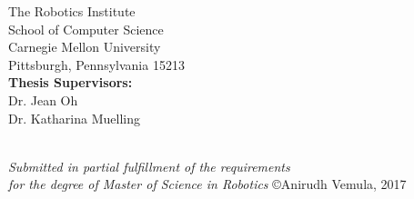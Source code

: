 \begin{center}
\vspace{1cm}
{\Large
  The Robotics Institute\\
  School of Computer Science \\
  Carnegie Mellon University\\
  Pittsburgh, Pennsylvania 15213\\
}
\vspace{1cm}
{\Large
{\bf Thesis Supervisors:}\\
Dr. Jean Oh\\
Dr. Katharina Muelling
}
\vspace{1cm}
\par ~ \\
{\large \it Submitted in partial fulfillment of the requirements \\for the degree of Master of Science in Robotics}
\vfill
{\large \copyright Anirudh Vemula, 2017}
\end{center}



